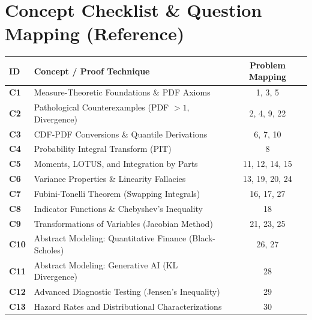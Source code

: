 \documentclass[11pt, a4paper]{article}
\theoremstyle{definition}
\theoremstyle{remark}
\begin{document}
\newpage

\section{Concept Checklist \& Question Mapping (Reference)}
\label{sec:checklist_end}

\renewcommand{\arraystretch}{1.5}
\noindent
\begin{tabularx}{\textwidth}{>{\bfseries}l X c}
\toprule
ID & Concept / Proof Technique & Problem Mapping \\
\midrule
C1 & Measure-Theoretic Foundations \& PDF Axioms & 1, 3, 5 \\
C2 & Pathological Counterexamples (PDF $> 1$, Divergence) & 2, 4, 9, 22 \\
C3 & CDF-PDF Conversions \& Quantile Derivations & 6, 7, 10 \\
C4 & Probability Integral Transform (PIT) & 8 \\
C5 & Moments, LOTUS, and Integration by Parts & 11, 12, 14, 15 \\
C6 & Variance Properties \& Linearity Fallacies & 13, 19, 20, 24 \\
C7 & Fubini-Tonelli Theorem (Swapping Integrals) & 16, 17, 27 \\
C8 & Indicator Functions \& Chebyshev's Inequality & 18 \\
C9 & Transformations of Variables (Jacobian Method) & 21, 23, 25 \\
C10 & Abstract Modeling: Quantitative Finance (Black-Scholes) & 26, 27 \\
C11 & Abstract Modeling: Generative AI (KL Divergence) & 28 \\
C12 & Advanced Diagnostic Testing (Jensen's Inequality) & 29 \\
C13 & Hazard Rates and Distributional Characterizations & 30 \\
\bottomrule
\end{tabularx}
\end{document}
